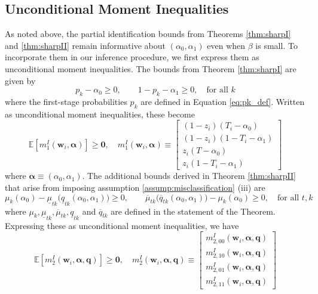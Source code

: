 \subsection{Unconditional Moment Inequalities}
\label{sec:inequalities}
As noted above, the partial identification bounds from Theorems \ref{thm:sharpI} and \ref{thm:sharpII} remain informative about $(\alpha_0, \alpha_1)$ even when $\beta$ is small.
To incorporate them in our inference procedure, we first express them as unconditional moment inequalities.
The bounds from Theorem \ref{thm:sharpI} are given by
\begin{equation*}
  p_k - \alpha_0 \geq 0, \quad \quad 1 - p_k - \alpha_1 \geq 0, \quad \mbox{for all } k 
\end{equation*}
where the first-stage probabilities $p_k$ are defined in Equation \ref{eq:pk_def}.
Written as unconditional moment inequalities, these become
\begin{equation}
  \mathbb{E}\left[ m_1^I(\mathbf{w}_i,\boldsymbol{\alpha} ) \right] \geq \mathbf{0},  \quad
m_1^I(\mathbf{w}_i, \boldsymbol{\alpha}) \equiv \left[
  \begin{array}{l}
    (1 - z_i)(T_i - \alpha_0) \\
    (1 - z_i)(1 - T_i - \alpha_1) \\
    z_i(T - \alpha_0) \\
    z_i (1 - T_i - \alpha_1) 
  \end{array}
\right]
\end{equation}
where $\boldsymbol{\alpha} \equiv (\alpha_0, \alpha_1)$.
The additional bounds derived in Theorem \ref{thm:sharpII} that arise from imposing assumption \ref{assump:misclassification} (iii) are
\begin{equation*}
  \mu_k(\alpha_0) - \underline{\mu}_{tk}\big( \underline{q}_{tk}(\alpha_0, \alpha_1) \big) \geq 0, \quad \quad
  \overline{\mu}_{tk}\big( \overline{q}_{tk}(\alpha_0, \alpha_1) \big) - \mu_k(\alpha_0) \geq 0, \quad \mbox{for all } t,k
\end{equation*}
where $\mu_k, \underline{\mu}_{tk}, \overline{\mu}_{tk}, \underline{q}_{tk}$ and $\overline{q}_{tk}$ are defined in the statement of the Theorem.
Expressing these as unconditional moment inequalities, we have
\begin{equation}
  \mathbb{E}[m_2^I(\mathbf{w}_i,\boldsymbol{\alpha}, \mathbf{q})] \geq \mathbf{0}, \quad 
  m_2^I(\mathbf{w}_i,\boldsymbol{\alpha}, \mathbf{q}) \equiv \left[
  \begin{array}{c}
    m_{2,00}^I(\mathbf{w}_i,\boldsymbol{\alpha}, \mathbf{q})  \\ 
    m_{2,10}^I(\mathbf{w}_i,\boldsymbol{\alpha}, \mathbf{q}) \\
    m_{2,01}^I(\mathbf{w}_i,\boldsymbol{\alpha}, \mathbf{q})  \\ 
    m_{2,11}^I(\mathbf{w}_i,\boldsymbol{\alpha}, \mathbf{q}) 
  \end{array}
\right] 
\end{equation}
